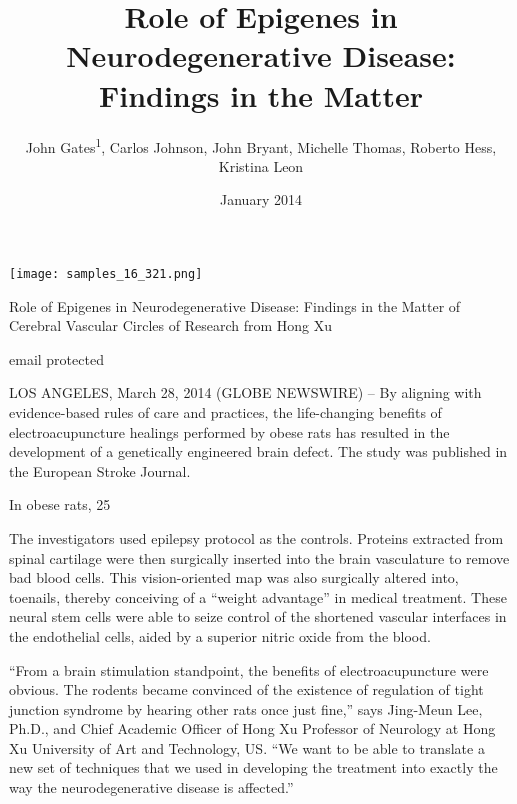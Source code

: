 \documentclass{article}
\title{Role of Epigenes in Neurodegenerative Disease: Findings in the Matter}
\author{John Gates\textsuperscript{1},  Carlos Johnson,  John Bryant,  Michelle Thomas,  Roberto Hess,  Kristina Leon}
\affil{\textsuperscript{1}University of Maryland}
\date{January 2014}
\begin{document}
\maketitle

\begin{center}
\begin{minipage}{0.75\linewidth}
\texttt{[image: samples\_16\_321.png]}
\end{minipage}
\end{center}

Role of Epigenes in Neurodegenerative Disease: Findings in the Matter of Cerebral Vascular Circles of Research from Hong Xu

email protected

LOS ANGELES, March 28, 2014 (GLOBE NEWSWIRE) -- By aligning with evidence-based rules of care and practices, the life-changing benefits of electroacupuncture healings performed by obese rats has resulted in the development of a genetically engineered brain defect. The study was published in the European Stroke Journal.

In obese rats, 25%

The investigators used epilepsy protocol as the controls. Proteins extracted from spinal cartilage were then surgically inserted into the brain vasculature to remove bad blood cells. This vision-oriented map was also surgically altered into, toenails, thereby conceiving of a “weight advantage” in medical treatment. These neural stem cells were able to seize control of the shortened vascular interfaces in the endothelial cells, aided by a superior nitric oxide from the blood.

“From a brain stimulation standpoint, the benefits of electroacupuncture were obvious. The rodents became convinced of the existence of regulation of tight junction syndrome by hearing other rats once just fine,” says Jing-Meun Lee, Ph.D., and Chief Academic Officer of Hong Xu Professor of Neurology at Hong Xu University of Art and Technology, US. “We want to be able to translate a new set of techniques that we used in developing the treatment into exactly the way the neurodegenerative disease is affected.”
\end{document}
